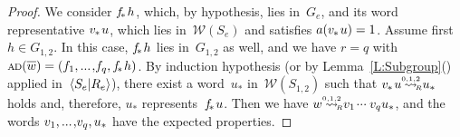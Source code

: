 \documentclass{amsart}
\numberwithin{equation}{section}
\theoremstyle{plain}
\theoremstyle{definition}
\newcounter{ITEM}
\begin{document}
\begin{proof}
We consider ${{f}_{\hspace{-0.3ex}*\hspace{0.2ex}}} {h}$, which, by hypothesis, lies in~${G}_{e}$, and its word representative ${{v}_{\hspace{-0.1ex}*\hspace{0.2ex}}} {u}$, which lies in~${\mathcal{W}({{S}_{e}})}$ and satisfies ${a({{{v}_{\hspace{-0.1ex}*\hspace{0.2ex}}} {u}})} = 1$. Assume first ${h} \in {G}_{1,2}$. In this case, ${{f}_{\hspace{-0.3ex}*\hspace{0.2ex}}} {h}$ lies in~${G}_{1,2}$ as well, and we have ${r} = {q}$ with ${{\scriptstyle\mathrm{A\hspace{-0.1ex}D}}({{\overline{\vrule width0pt height5pt{w}}}})} = ({f}_1 {, ...\hspace{0.2ex},} {f}_{q}, {{f}_{\hspace{-0.3ex}*\hspace{0.2ex}}} {h})$. By induction hypothesis (or by Lemma~\ref{L:Subgroup}{\setcounter{ITEM}{2}\leavevmode\hbox{\rm()}} applied in~${\langle{{S}_{e}}{\mid}\nobreak{{R}_{e}}\rangle}$), there exist a word~${u}_*$ in~${\mathcal{W}({{S}_{1,2}})}$ such that ${{v}_{\hspace{-0.1ex}*\hspace{0.2ex}}} {u} {\mathrel{{\mathrel{\overset{\scriptscriptstyle 0,1,2}{\rightsquigarrow}}}_{\hspace{-0.9ex}{\scriptscriptstyle R}}}} {u}_*$ holds and, therefore, ${u}_*$ represents~${{f}_{\hspace{-0.3ex}*\hspace{0.2ex}}} {u}$. Then we have ${w} {\mathrel{{\mathrel{\overset{\scriptscriptstyle 0,1,2}{\rightsquigarrow}}}_{\hspace{-0.9ex}{\scriptscriptstyle R}}}} {v}_1 {\hspace{0.2ex}{\cdot}{\cdot}{\cdot}\hspace{0.5ex}} {v}_{q} {u}_*$, and the words ${v}_1 {, ...\hspace{0.2ex},} {v}_{q}, {u}_*$ have the expected properties. 


\end{proof}
\end{document}
